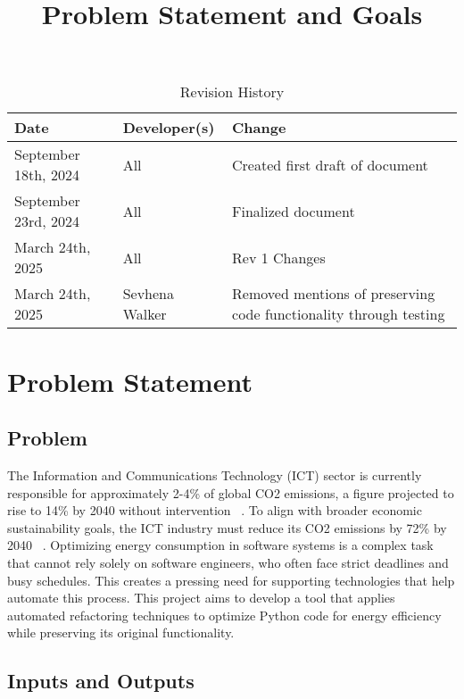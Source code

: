 \documentclass{article}
\title{Problem Statement and Goals\\\progname}
\author{\authname}
\date{}
\begin{document}
\maketitle

\begin{table}[hp]
  \caption{Revision History} \label{TblRevisionHistory}
  \begin{tabularx}{\textwidth}{llX}
    \toprule
    \textbf{Date} & \textbf{Developer(s)} & \textbf{Change}\\
    \midrule
    September 18th, 2024 & All & Created first draft of document\\
    September 23rd, 2024 & All & Finalized document\\
    March 24th, 2025 & All & Rev 1 Changes \\
    March 24th, 2025 & Sevhena Walker & Removed mentions of preserving code functionality through testing \\
    \bottomrule
  \end{tabularx}
\end{table}

\newpage

\section{Problem Statement}

\subsection{Problem}

The Information and Communications Technology (ICT) sector is currently 
responsible for approximately 2-4\% of global CO2 emissions, a figure 
projected to rise to 14\% by 2040 without intervention ~\citep{BelkhirAndElmeligi2018}. 
To align with broader economic sustainability goals, 
the ICT industry must reduce its CO2 emissions by 72\% by 
2040 ~\citep{FreitagAndBernersLee2021}. Optimizing energy 
consumption in software systems is a complex task that cannot 
rely solely on software engineers, who often face strict deadlines 
and busy schedules. This creates a pressing need for supporting 
technologies that help automate this process. This project aims 
to develop a tool that applies automated refactoring techniques 
to optimize Python code for energy efficiency while preserving its 
original functionality. 

\subsection{Inputs and Outputs}
\end{document}

